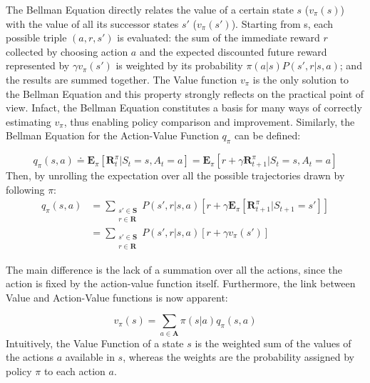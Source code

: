             The Bellman Equation directly relates the value of a certain state $s$ ($v_{\pi}(s)$) with the value of all its successor states $s'$ ($v_{\pi}(s')$). Starting from s, each possible triple $(a, r, s')$ is evaluated: the sum of the immediate reward $r$ collected by choosing action $a$ and the expected discounted future reward represented by $\gamma v_{\pi}(s')$ is weighted by its probability $\pi(a|s)P(s',r|s,a)$; and the results are summed together. The Value function $v_{\pi}$ is the only solution to the Bellman Equation and this property strongly reflects on the practical point of view. Infact, the Bellman Equation constitutes a basis for many ways of correctly estimating $v_{\pi}$, thus enabling policy comparison and improvement. \newline
            Similarly, the Bellman Equation for the Action-Value Function $q_{\pi}$ can be defined:
            \begin{definition}
                \label{def:bellmanaction}
                \[ q_{\pi}(s, a) \doteq \mathbf{E}_{\pi} \left[ \mathbf{R}_{t}^{\pi} | S_{t} = s, A_{t} = a\right] =
                    \mathbf{E}_{\pi} \left[ r + \gamma \mathbf{R}_{t+1}^{\pi} | S_{t} = s, A_{t} = a \right] \]
                Then, by unrolling the expectation over all the possible trajectories drawn by following $\pi$:
                \begin{align*}
                    q_{\pi}(s,a) &= \sum_{\substack{s' \in \mathbf{S}\\r \in \mathbf{R}}} P(s', r | s, a)
                                \left[ r + \gamma \mathbf{E}_{\pi} \left[ \mathbf{R}_{t+1}^{\pi} | S_{t+1} = s'\right] \right] \\        
                                 &= \sum_{\substack{s' \in \mathbf{S}\\r \in \mathbf{R}}} P(s', r | s, a)
                                \left[ r + \gamma v_{\pi}(s') \right]
                \end{align*} 
            \end{definition}
            The main difference is the lack of a summation over all the actions, since the action is fixed by the action-value function itself. Furthermore, the link between Value and Action-Value functions is now apparent:
            
            \begin{property}
                \label{prop:linkvq}
                \[ v_{\pi}(s) = \sum_{a \in \mathbf{A}} \pi(s|a) q_{\pi}(s,a)\]
                Intuitively, the Value Function of a state $s$ is the weighted sum of the values of the actions $a$ available in $s$, whereas the weights are the probability assigned by policy $\pi$ to each action $a$.
            \end{property}
            
